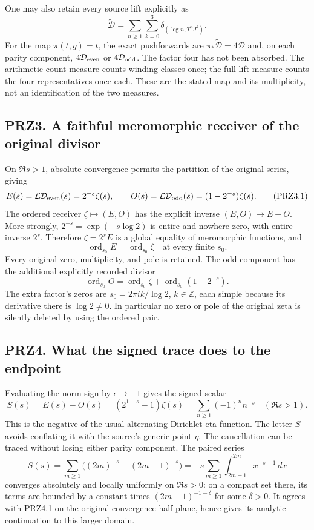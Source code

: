 \documentclass[
]{article}
\begin{document}
One may also retain every source lift explicitly as \[
\widetilde{\mathcal D}
=\sum_{n\ge1}\sum_{k=0}^{3}\delta_{(\log n,T^nJ^k)}.
\tag{PRZ2.3}
\] For the map \(\pi(t,g)=t\), the exact pushforwards are
\(\pi_*\widetilde{\mathcal D}=4\mathcal D\) and, on each parity
component, \(4\mathcal D_{\rm even}\) or \(4\mathcal D_{\rm odd}\). The
factor four has not been absorbed. The arithmetic count measure counts
winding classes once; the full lift measure counts the four
representatives once each. These are the stated map and its
multiplicity, not an identification of the two measures.

\subsection{PRZ3. A faithful meromorphic receiver of the original
divisor}\label{prz3.-a-faithful-meromorphic-receiver-of-the-original-divisor}

On \(\Re s>1\), absolute convergence permits the partition of the
original series, giving \[
E(s)=\mathcal L\mathcal D_{\rm even}(s)=2^{-s}\zeta(s),\qquad
O(s)=\mathcal L\mathcal D_{\rm odd}(s)=(1-2^{-s})\zeta(s).
\tag{PRZ3.1}
\] The ordered receiver \(\zeta\mapsto(E,O)\) has the explicit inverse
\((E,O)\mapsto E+O\). More strongly, \(2^{-s}=\exp(-s\log2)\) is entire
and nowhere zero, with entire inverse \(2^s\). Therefore \(\zeta=2^sE\)
is a global equality of meromorphic functions, and \[
\operatorname{ord}_{s_0}E=\operatorname{ord}_{s_0}\zeta
\quad\text{at every finite }s_0.
\tag{PRZ3.2}
\] Every original zero, multiplicity, and pole is retained. The odd
component has the additional explicitly recorded divisor \[
\operatorname{ord}_{s_0}O
=\operatorname{ord}_{s_0}\zeta+\operatorname{ord}_{s_0}(1-2^{-s}).
\tag{PRZ3.3}
\] The extra factor's zeros are \(s_0=2\pi i k/\log2\),
\(k\in\mathbb Z\), each simple because its derivative there is
\(\log2\ne0\). In particular no zero or pole of the original zeta is
silently deleted by using the ordered pair.

\subsection{PRZ4. What the signed trace does to the
endpoint}\label{prz4.-what-the-signed-trace-does-to-the-endpoint}

Evaluating the norm sign by \(\epsilon\mapsto-1\) gives the signed
scalar \[
S(s)=E(s)-O(s)=(2^{1-s}-1)\zeta(s)
=\sum_{n\ge1}(-1)^n n^{-s}\quad(\Re s>1).
\tag{PRZ4.1}
\] This is the negative of the usual alternating Dirichlet eta function.
The letter \(S\) avoids conflating it with the source's generic point
\(\eta\). The cancellation can be traced without losing either parity
component. The paired series \[
S(s)=\sum_{m\ge1}\bigl((2m)^{-s}-(2m-1)^{-s}\bigr)
=-s\sum_{m\ge1}\int_{2m-1}^{2m}x^{-s-1}\,dx
\tag{PRZ4.2}
\] converges absolutely and locally uniformly on \(\Re s>0\): on a
compact set there, its terms are bounded by a constant times
\((2m-1)^{-1-\delta}\) for some \(\delta>0\). It agrees with PRZ4.1 on
the original convergence half-plane, hence gives its analytic
continuation to this larger domain.
\end{document}
